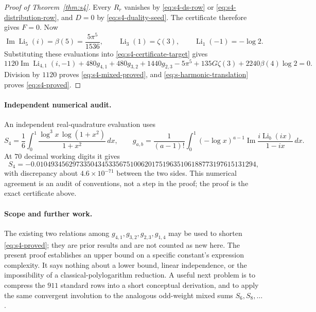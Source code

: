 \begin{proof}[Proof of Theorem~\ref{thm:s4}]
Every $R_r$ vanishes by \eqref{eq:s4-ds-row} or
\eqref{eq:s4-distribution-row}, and $D=0$ by
\eqref{eq:s4-duality-seed}. The certificate therefore gives $F=0$.
Now
\[
 \operatorname{Im}\operatorname{Li}_5(i)=\beta(5)=\frac{5\pi^5}{1536},
 \qquad \operatorname{Li}_3(1)=\zeta(3),
 \qquad \operatorname{Li}_1(-1)=-\log2.
\]
Substituting these evaluations into \eqref{eq:s4-certificate-target} gives
\[
 1120\operatorname{Im}\operatorname{Li}_{4,1}(i,-1)
 +480g_{4,1}+480g_{3,2}+1440g_{2,3}
 -5\pi^5+135G\zeta(3)+2240\beta(4)\log2=0.
\]
Division by $1120$ proves \eqref{eq:s4-mixed-proved}, and
\eqref{eq:s-harmonic-translation} proves \eqref{eq:s4-proved}.
\end{proof}

\paragraph{Independent numerical audit.}
An independent real-quadrature evaluation uses
\[
 S_4=\frac16\int_0^1\frac{\log^3x\,\log(1+x^2)}{1+x^2}\,dx,
 \qquad
 g_{a,b}=\frac1{(a-1)!}\int_0^1(-\log x)^{a-1}
 \operatorname{Im}\frac{i\operatorname{Li}_b(ix)}{1-ix}\,dx.
\]
At $70$ decimal working digits it gives
\[
 S_4=-0.0104934562973350434533567510062017519635106188773197615131294,
\]
with discrepancy about $4.6\times10^{-71}$ between the two sides.
This numerical agreement is an audit of conventions, not a step in the
proof; the proof is the exact certificate above.

\paragraph{Scope and further work.}
The existing two relations among $g_{4,1},g_{3,2},g_{2,3},g_{1,4}$ may be
used to shorten \eqref{eq:s4-proved}; they are prior results and are not
counted as new here. The present proof establishes an upper bound on a
specific constant's expression complexity. It says nothing about a lower
bound, linear independence, or the impossibility of a classical-polylogarithm
reduction. A useful next problem is to compress the $911$ standard rows
into a short conceptual derivation, and to apply the same convergent
involution to the analogous odd-weight mixed sums $S_6,S_8,\ldots$.
